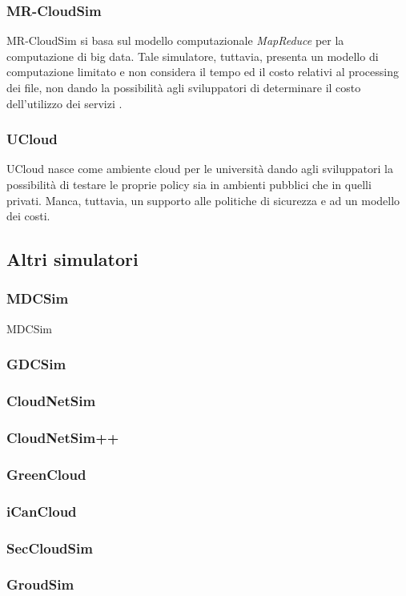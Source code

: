 {\subsubsection*{MR-CloudSim}
MR-CloudSim \cite{jung2012mr} si basa sul modello computazionale \emph{MapReduce} \cite{dean2008mapreduce} per la computazione di big data. Tale simulatore, tuttavia, presenta un modello di computazione limitato e non considera il tempo ed il costo relativi al processing dei file, non dando la possibilità agli sviluppatori di determinare il costo dell'utilizzo dei servizi \cite{mansouri2020cloud}. 
\subsubsection*{UCloud}
UCloud \cite{sqalli2012ucloud} nasce come ambiente cloud per le università dando agli sviluppatori la possibilità di testare le proprie policy sia in ambienti pubblici che in quelli privati. Manca, tuttavia, un supporto alle politiche di sicurezza e ad un modello dei costi.
\subsection{Altri simulatori}
\subsubsection*{MDCSim}
MDCSim \cite{lim2009mdcsim} 
\subsubsection*{GDCSim}
\subsubsection*{CloudNetSim}
\subsubsection*{CloudNetSim++}
\subsubsection*{GreenCloud}
\subsubsection*{iCanCloud}
\subsubsection*{SecCloudSim}
\subsubsection*{GroudSim}
}
